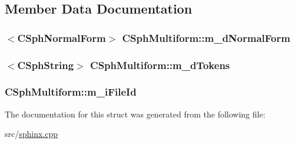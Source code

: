 \subsection{Member Data Documentation}
\hypertarget{structCSphMultiform_a0ebd537e222f2ba71e7e77e3379aefea}{
\subsubsection[{m\-\_\-d\-Normal\-Form}]{$<${\bf C\-Sph\-Normal\-Form}$>$ C\-Sph\-Multiform\-::m\-\_\-d\-Normal\-Form}}\label{structCSphMultiform_a0ebd537e222f2ba71e7e77e3379aefea}
\hypertarget{structCSphMultiform_ad35e075e8d4e97c95c4ad9de393074d2}{
\subsubsection[{m\-\_\-d\-Tokens}]{$<${\bf C\-Sph\-String}$>$ C\-Sph\-Multiform\-::m\-\_\-d\-Tokens}}\label{structCSphMultiform_ad35e075e8d4e97c95c4ad9de393074d2}
\hypertarget{structCSphMultiform_a61336b1112ad769d741b7549261597d2}{
\subsubsection[{m\-\_\-i\-File\-Id}]{ C\-Sph\-Multiform\-::m\-\_\-i\-File\-Id}}\label{structCSphMultiform_a61336b1112ad769d741b7549261597d2}


The documentation for this struct was generated from the following file\-:\begin{DoxyCompactItemize}
\item 
src/\hyperlink{sphinx_8cpp}{sphinx.\-cpp}\end{DoxyCompactItemize}
